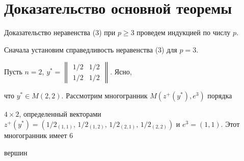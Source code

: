 \section{Доказательство основной теоремы}





Доказательство неравенства (3) при $p\geq 3$ проведем индукцией по числу $p$.





Сначала установим справедливость неравенства (3) для $p=3$.





Пусть $n=2$, $y^\ast=


\begin{Vmatrix} 1/2 & 1/2\\ 1/2 & 1/2 \end{Vmatrix}$. Ясно,


что $y^\ast\in M(2,2)$. Рассмотрим многогранник $M(z^+(y^\ast),e^3)$ порядка


$4\times 2$, определенный векторами $z^+(y^\ast)=(1/2_{(1,1)},\,1/2_{(1,2)},


\,1/2_{(2,1)},\,1/2_{(2,2)})$ и $e^3=(1,1)$. Этот многогранник имеет 6


вершин


